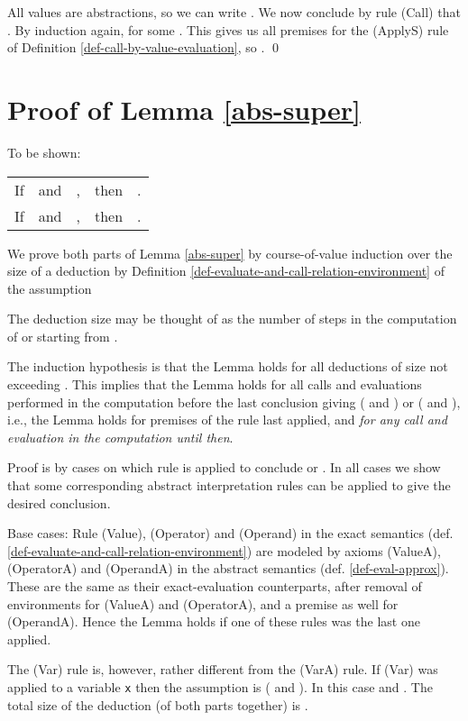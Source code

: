 \documentclass{LMCS}
\newcommand{\fl}{\noindent}
\newcommand{\vair}{\relax}
\newcommand{\bt}{\begin{tabular}}
\newcommand{\et}{\end{tabular}}
\newcommand{\bprf}{\proof}
\newcommand{\eprf}{\qed}
\theoremstyle{definition}\newtheorem{env}[thm]{Environment}
\begin{document}
All values are abstractions, so we can write 
.
We  now conclude by rule (Call) 
that
. 
 By induction again, 
 for some .
This gives us all premises for the (ApplyS) rule of
Definition \ref{def-call-by-value-evaluation}, so
 .
\eprf







\section{Proof of Lemma \ref{abs-super}}

\bprf  To be shown:
\hfill  \bt{ccccc} If  &and& , &then& 
. \\

\hfill  If    &and& , &then& .
\et
\vair

\fl We prove both parts of Lemma \ref{abs-super} by course-of-value induction over the size  of a deduction   by Definition \ref{def-evaluate-and-call-relation-environment} of the
assumption 

The deduction size may be 
thought of as the number of 
steps in the computation of 
 or  starting from .


The induction hypothesis  is that the Lemma holds for all 
deductions of size not exceeding .
This implies that the Lemma holds for all
calls and evaluations performed in the computation before the last 
conclusion giving 
( and ) or ( and ), i.e.,  the Lemma holds for premises of the  rule last applied, and 
{\em for any call and 
evaluation in the computation until then}.


Proof  is by cases on which rule is applied to conclude 
 or . 
In all cases we show that some corresponding abstract interpretation rules  
can be applied to 
give the desired conclusion. 

Base cases: Rule (Value), (Operator) and 
(Operand) in the exact semantics (def. \ref{def-evaluate-and-call-relation-environment}) are modeled by axioms (ValueA), 
(OperatorA) and 
(OperandA) in the abstract semantics (def. \ref{def-eval-approx}). These are the same as their 
exact-evaluation 
counterparts, after removal of  environments for  (ValueA) and 
(OperatorA), 
and a premise as well for (OperandA). 
Hence the Lemma holds if one of these rules was the last one applied.

The (Var) rule is, however, rather different from the (VarA) rule.
If  (Var)  was applied to a variable {\tt x} 
then the assumption is ( and 
).
In this case  
and
.   
The total size of the deduction 
(of both parts together) 
is . 
\end{document}
